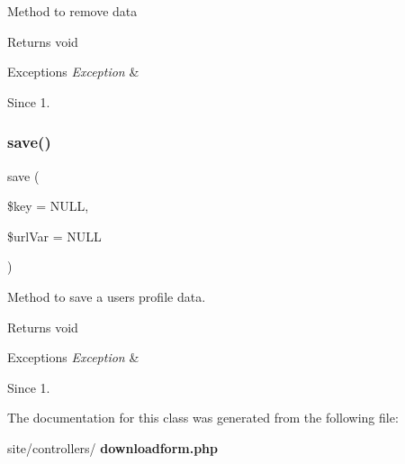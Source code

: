 Method to remove data

\begin{DoxyReturn}{Returns}
void
\end{DoxyReturn}

\begin{DoxyExceptions}{Exceptions}
{\em Exception} & \\
\hline
\end{DoxyExceptions}
\begin{DoxySince}{Since}
1. 
\end{DoxySince}
\mbox{\label{classtks__agenda_controller_download_form_ac00855ace03b6824b4e1bdc9060ebab0}} 
\subsubsection{save()}
{\footnotesize\ttfamily save (\begin{DoxyParamCaption}\item[{}]{\$key = {\ttfamily NULL},  }\item[{}]{\$url\+Var = {\ttfamily NULL} }\end{DoxyParamCaption})}

Method to save a user\textquotesingle{}s profile data.

\begin{DoxyReturn}{Returns}
void
\end{DoxyReturn}

\begin{DoxyExceptions}{Exceptions}
{\em Exception} & \\
\hline
\end{DoxyExceptions}
\begin{DoxySince}{Since}
1. 
\end{DoxySince}


The documentation for this class was generated from the following file\+:\begin{DoxyCompactItemize}
\item 
site/controllers/\textbf{ downloadform.\+php}\end{DoxyCompactItemize}
